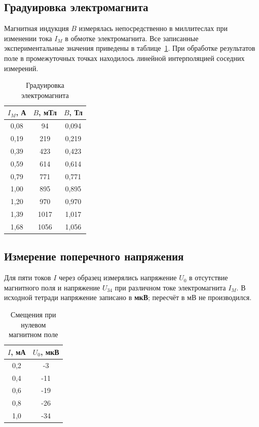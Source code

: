 \documentclass[12pt,a4paper]{article}
\begin{document}
\subsection{Градуировка электромагнита}
Магнитная индукция $B$ измерялась непосредственно в миллитеслах при
изменении тока $I_M$ в обмотке электромагнита. Все записанные
экспериментальные значения приведены в таблице~\ref{tab:calib}.
При обработке результатов поле в промежуточных точках находилось
линейной интерполяцией соседних измерений.

\begin{table}[H]
\centering
\caption{Градуировка электромагнита}
\label{tab:calib}
\begin{tabular}{@{}ccc@{}}
\toprule
$I_M$, А & $B$, мТл & $B$, Тл \\
\midrule
0{,}08 & 94 & 0{,}094 \\
0{,}19 & 219 & 0{,}219 \\
0{,}39 & 423 & 0{,}423 \\
0{,}59 & 614 & 0{,}614 \\
0{,}79 & 771 & 0{,}771 \\
1{,}00 & 895 & 0{,}895 \\
1{,}20 & 970 & 0{,}970 \\
1{,}39 & 1017 & 1{,}017 \\
1{,}68 & 1056 & 1{,}056 \\
\bottomrule
\end{tabular}
\end{table}

\subsection{Измерение поперечного напряжения}
Для пяти токов $I$ через образец измерялись напряжение $U_0$ в
отсутствие магнитного поля и напряжение $U_{34}$ при различном токе
электромагнита $I_M$. В исходной тетради напряжение записано в
\textbf{мкВ}; пересчёт в мВ не производился.

\begin{table}[H]
\centering
\caption{Смещения при нулевом магнитном поле}
\label{tab:u0}
\begin{tabular}{@{}cc@{}}
\toprule
$I$, мА & $U_0$, мкВ \\
\midrule
0{,}2 & -3 \\
0{,}4 & -11 \\
0{,}6 & -19 \\
0{,}8 & -26 \\
1{,}0 & -34 \\
\bottomrule
\end{tabular}
\end{table}
\end{document}

